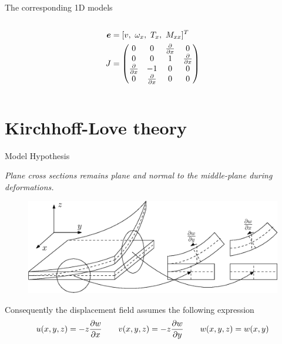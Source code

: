 \documentclass{beamer}
\begin{document}
\begin{frame}{The corresponding 1D models}
\begin{columns}
\begin{column}[t]{0.5\textwidth}
\begin{equation*}
\begin{aligned}
	\bm{e} &= [v, \ \omega_x, \ T_x, \ M_{xx} ]^T \\
	J &= 
	\begin{pmatrix}
	0 & 0 &  \diffp{}{x} & 0 \\
	0 & 0 &  1 & \diffp{}{x} \\
	\diffp{}{x} & -1 & 0 & 0  \\
	0 & \diffp{}{x} & 0 & 0 \\
	\end{pmatrix}	
	\end{aligned}
	\end{equation*}
	\end{column}
\end{columns}
\end{frame}

\section{Kirchhoff-Love theory}

\begin{frame}{Model Hypothesis}
\begin{tcolorbox}
	\textit{Plane cross sections remains plane and normal to the middle-plane during deformations.} 
	\begin{figure}
		\centering
		\includegraphics[height=0.4\textheight]{Kirchh_sketch.eps}
	\end{figure}	
\end{tcolorbox}

Consequently the displacement field assumes the following expression
\begin{equation*}
u(x,y,z) = -z \diffp{w}{x} \qquad v(x,y,z) = -z \diffp{w}{y} \qquad 
w(x,y,z) = w(x,y)
\end{equation*}
\end{frame}
\end{document}
